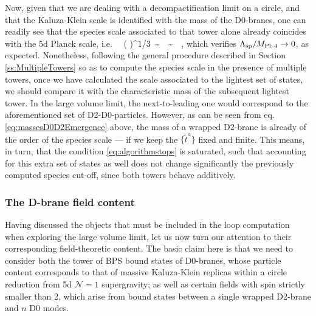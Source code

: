 \eeq
%
Now, given that we are dealing with a decompactification limit on a circle, and that the Kaluza-Klein scale is identified with the mass of the D0-branes, one can readily see that the species scale associated to that tower alone already coincides with the 5d Planck scale, i.e.
%
\beq \label{eq:D0towerEmergence}
		\frac{\LSP}{\Mpf}\, \simeq\, \left(  \right)^{1/3}\, \sim\, \, \sim\, \, ,
\eeq
%
which verifies $\Lambda_{\text{sp}}/M_{\text{Pl;}\, 4} \to 0$, as expected. Nonetheless, following the general procedure described in Section \ref{ss:MultipleTowers} so as to compute the species scale in the presence of multiple towers, once we have calculated the scale associated to the lightest set of states, we should compare it with the characteristic mass of the subsequent lightest tower. In the large volume limit, the next-to-leading one would correspond to the aforementioned set of D2-D0-particles. However, as can be seen from eq. \eqref{eq:massesD0D2Emergence} above, the mass of a wrapped D2-brane is already of the order of the species scale --- if we keep the $\{ \tilde{t}^a\}$ fixed and finite. This means, in turn, that the condition \eqref{eq:algorithmstops} is saturated, such that accounting for this extra set of states as well does not change significantly the previously computed species cut-off, since both towers behave additively. 
		
\subsubsection*{The D-brane field content}
		
Having discussed the objects that must be included in the loop computation when exploring the large volume limit, let us now turn our attention to their corresponding field-theoretic content. The basic claim here is that we need to consider both the tower of BPS bound states of D0-branes, whose particle content corresponds to that of massive Kaluza-Klein replicas within a circle reduction from 5d $\mathcal{N}=1$ supergravity; as well as certain fields with spin strictly smaller than 2, which arise from bound states between a single wrapped D2-brane and $n$ D0 modes. 
		
